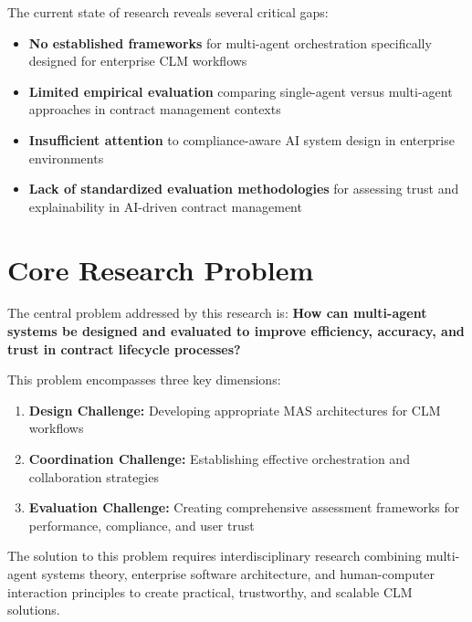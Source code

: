 The current state of research reveals several critical gaps:

\begin{itemize}
    \item \textbf{No established frameworks} for multi-agent orchestration specifically designed for enterprise CLM workflows
    \item \textbf{Limited empirical evaluation} comparing single-agent versus multi-agent approaches in contract management contexts
    \item \textbf{Insufficient attention} to compliance-aware AI system design in enterprise environments
    \item \textbf{Lack of standardized evaluation methodologies} for assessing trust and explainability in AI-driven contract management
\end{itemize}

\section{Core Research Problem}

The central problem addressed by this research is: \textbf{How can multi-agent systems be designed and evaluated to improve efficiency, accuracy, and trust in contract lifecycle processes?}

This problem encompasses three key dimensions:
\begin{enumerate}
    \item \textbf{Design Challenge:} Developing appropriate MAS architectures for CLM workflows
    \item \textbf{Coordination Challenge:} Establishing effective orchestration and collaboration strategies
    \item \textbf{Evaluation Challenge:} Creating comprehensive assessment frameworks for performance, compliance, and user trust
\end{enumerate}

The solution to this problem requires interdisciplinary research combining multi-agent systems theory, enterprise software architecture, and human-computer interaction principles to create practical, trustworthy, and scalable CLM solutions.

